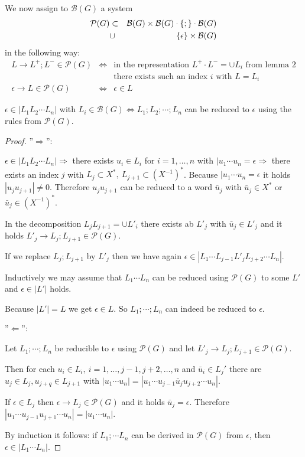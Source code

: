 We now assign to $\mathcal{B}(G)$ a system 
\begin{eqnarray*} 
\mathcal{P}(G) & \subset & \mathcal{B}(G) \times \mathcal{B}(G) \cdot \mbox{$\{;\}$}
\cdot \mathcal{B}(G) \\
& \cup & \mbox{$\{\epsilon\}$} \times \mathcal{B}(G)
\end{eqnarray*}
in the following way:
\begin{eqnarray*}
L \to L^+ ; L^- \in \mathcal{P}(G) & \iff & \text{in the representation } L^+
  \cdot L^- = \cup L_i \text{ from lemma 2} \\
  & & \text {there exists such an index $i$ with $L = L_i$} \\
\epsilon \to L \in \mathcal{P}(G) & \iff & \epsilon \in L
\end{eqnarray*}

\begin{lemma}
$\epsilon \in |L_1 L_2 \cdots L_n|$ with $L_i \in \mathcal{B}(G) \iff
L_1;L_2;\cdots ;L_n$ can be reduced to $\epsilon$ using the rules from
$\mathcal{P}(G)$.
\end{lemma}

\begin{proof}

''$\Rightarrow$'':

$\epsilon \in |L_1 L_2 \cdots L_n| \Rightarrow$ there exists $u_i \in L_i$ for
$i = 1, \ldots, n$ with $|u_1 \cdots u_n = \epsilon \Rightarrow$ there exists an
index $j$ with $L_j \subset X^*,\ L_{j+1} \subset (X^{-1})^*$. Because $|u_1
\cdots u_n = \epsilon$ it holds $|u_j u_{j+1}| \neq 0$. Therefore $u_j u_{j+1}$
can be reduced to a word $\bar{u}_j$ with $\bar{u}_j \in X^*$ or $\bar{u}_j \in
(X^{-1})^*$.

In the decomposition $L_j L_{j+1} = \cup L'_i$ there exists ab $L'_j$ with
$\bar{u}_j \in L'_j$ and it holds $L'_j \to L_j;L_{j+1} \in \mathcal{P}(G)$.

If we replace $L_j;L_{j+1}$ by $L'_j$ then we have again $\epsilon \in |L_1
\cdots L_{j-1} L'_j L_{j+2} \cdots L_n|$.

Inductively we may assume that $L_1 \cdots L_n$ can be reduced using
$\mathcal{P}(G)$ to some $L'$ and $\epsilon \in |L'|$ holds.

Because $|L'| = L$ we get $\epsilon \in L$. So $L_1;\cdots;L_n$ can indeed be
reduced to $\epsilon$.

''$\Leftarrow$'':

Let $L_1;\cdots;L_n$ be reducible to $\epsilon$ using $\mathcal{P}(G)$ and let
$L'_j \to L_j;L_{j+1} \in \mathcal{P}(G)$.

Then for each $u_i \in L_i,\ i = 1,\ldots,j-1,j+2,\ldots,n$ and $\bar{u}_i \in
L_j'$ there are $u_j \in L_j, u_{j+q} \in L_{j+1}$ with $|u_1 \cdots u_n| =
|u_1 \cdots u_{j-1}\bar{u}_j u_{j+2} \cdots u_n|$.

If $\epsilon \in L_j$ then $\epsilon \to L_j \in \mathcal{P}(G)$ and it holds
$\bar{u}_j = \epsilon$. Therefore $|u_1 \cdots u_{j-1} u_{j+1} \cdots u_n| =
|u_1 \cdots u_n|$.

By induction it follows: if $L_1; \cdots L_n$ can be derived in
$\mathcal{P}(G)$ from $\epsilon$, then $\epsilon \in |L_1 \cdots L_n|$.
\end{proof}

